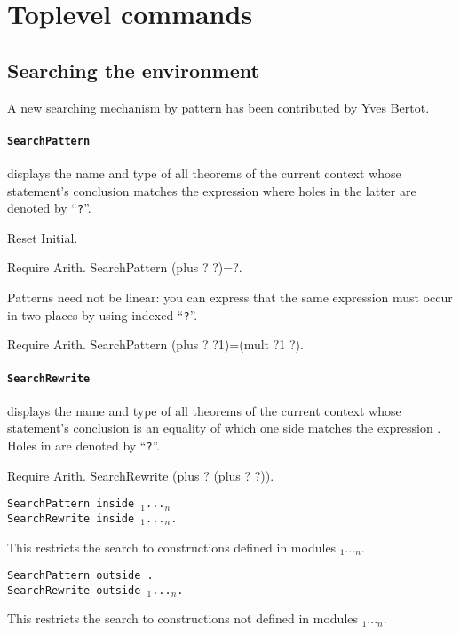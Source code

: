 \documentclass[11pt]{article}
\begin{document}
\section{Toplevel commands}

\subsection{Searching the environment}
\label{Search}
A new searching mechanism by pattern has been contributed by Yves Bertot.


\paragraph{{\tt SearchPattern {\term}}}
displays the name and type of all theorems of the current
context whose statement's conclusion matches the expression {\term}
where holes in the latter are denoted by ``{\tt ?}''.

\begin{coq_eval}
Reset Initial.
\end{coq_eval}
\begin{coq_example}
Require Arith.
SearchPattern (plus ? ?)=?.
\end{coq_example}

Patterns need not be linear: you can express that the same
expression must occur in two places by using indexed ``{\tt ?}''.

\begin{coq_example}
Require Arith.
SearchPattern (plus ? ?1)=(mult ?1 ?).
\end{coq_example}

\paragraph{{\tt SearchRewrite {\term}}}
displays the name and type of all theorems of the current
context whose statement's conclusion is an equality of which one side matches
the expression {\term}. Holes in {\term} are denoted by ``{\tt ?}''.

\begin{coq_example}
Require Arith.
SearchRewrite (plus ? (plus ? ?)).
\end{coq_example}

\begin{Variants}

\item {\tt SearchPattern {\term} inside {\module$_1$}...{\module$_n$}}\\
{\tt SearchRewrite {\term} inside
{\module$_1$}...{\module$_n$}.}

  This restricts the search to constructions defined in modules {\module$_1$}...{\module$_n$}.

\item {\tt SearchPattern {\term} outside {\module}.}\\
{\tt SearchRewrite {\term} outside {\module$_1$}...{\module$_n$}.}

  This restricts the search to constructions not defined in modules {\module$_1$}...{\module$_n$}.

\end{Variants}
\end{document}
